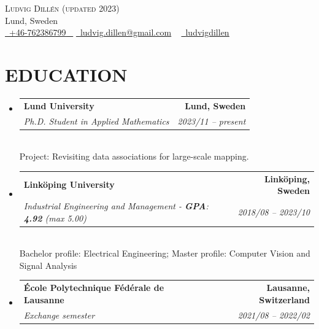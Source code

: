 \documentclass[letterpaper,11pt]{article}
\makeatletter
\newcommand{\resumeSubheading}[4]{
  \vspace{-2pt}\item
    \begin{tabular*}{1.0\textwidth}[t]{l@{\extracolsep{\fill}}r}
      \textbf{\large#1} & \textbf{\small #2} \\
      \textit{\large#3} & \textit{\small #4} \\
      
    \end{tabular*}\vspace{-7pt}
}
\newcommand{\resumeSubHeadingListStart}{\begin{itemize}[leftmargin=0.0in, label={}]}
\newcommand{\resumeSubHeadingListEnd}{\end{itemize}}
\makeatother
\begin{document}


\begin{center}
    {\Huge \scshape Ludvig Dillén (updated 2023)} \\ \vspace{1pt}
    Lund, Sweden \\ \vspace{1pt}
    \small \href{tel:+46-762386799}{ \raisebox{-0.1\height}\faPhone\ \underline{+46-762386799} ~} \href{mailto:ludvig.dillen@gmail.com}{\raisebox{-0.2\height}\faEnvelope\  \underline{ludvig.dillen@gmail.com}} ~ 
    \href{https://www.linkedin.com/in/ludvig-dill\%C3\%A9n-4161841a2/}{\raisebox{-0.2\height}\faLinkedinSquare\ \underline{ludvigdillen}}
    \vspace{-8pt}
\end{center}


\section{EDUCATION}
  \resumeSubHeadingListStart
    \resumeSubheading
      {Lund University}{Lund, Sweden}
      {Ph.D. Student in Applied Mathematics}{2023/11 -- present} \\
      \vspace{6pt}
      {Project: Revisiting data associations for large-scale mapping.}
  \resumeSubHeadingListEnd

  \resumeSubHeadingListStart
    \resumeSubheading
      {Linköping University}{Linköping, Sweden}
      {Industrial Engineering and Management - \textbf{GPA}: \textbf{4.92} (max 5.00)}{2018/08 -- 2023/10} \\
      \vspace{6pt}
      {Bachelor profile: Electrical Engineering; Master profile: Computer Vision and Signal Analysis}
  \resumeSubHeadingListEnd
  
  \resumeSubHeadingListStart
    \resumeSubheading
      {École Polytechnique Fédérale de Lausanne}{Lausanne, Switzerland}
      {Exchange semester} {2021/08 -- 2022/02}
  \resumeSubHeadingListEnd

\end{document}
